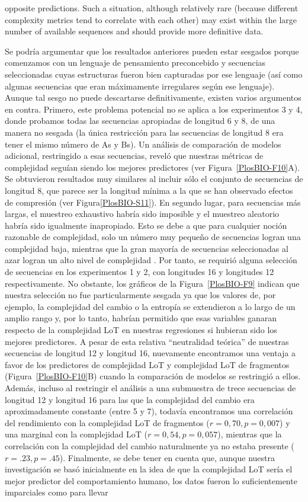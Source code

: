 opposite predictions. Such a situation, although relatively rare (because different complexity metrics tend to correlate with each other) may exist within the large number of available sequences and should provide more definitive data.

Se podría argumentar que los resultados anteriores pueden estar sesgados porque comenzamos con un lenguaje de pensamiento preconcebido y secuencias seleccionadas cuyas estructuras fueron bien capturadas por ese lenguaje (así como algunas secuencias que eran máximamente irregulares según ese lenguaje). Aunque tal sesgo no puede descartarse definitivamente, existen varios argumentos en contra. Primero, este problema potencial no se aplica a los experimentos 3 y 4, donde probamos todas las secuencias apropiadas de longitud 6 y 8, de una manera no sesgada (la única restricción para las secuencias de longitud 8 era tener el mismo número de As y Bs). Un análisis de comparación de modelos adicional, restringido a esas secuencias, reveló que nuestras métricas de complejidad seguían siendo los mejores predictores (ver Figura~\ref{PlosBIO-F10}A). Se obtuvieron resultados muy similares al incluir sólo el conjunto de secuencias de longitud 8, que parece ser la longitud mínima a la que se han observado efectos de compresión (ver Figura\ref{PlosBIO-S11}). En segundo lugar, para secuencias más largas, el muestreo exhaustivo habría sido imposible y el muestreo aleatorio habría sido igualmente inapropiado. Esto se debe a que para cualquier noción razonable de complejidad, solo un número muy pequeño de secuencias logran una complejidad baja, mientras que la gran mayoría de secuencias seleccionadas al azar logran un alto nivel de complejidad \cite{f43,li2013introduction}. Por tanto, se requirió alguna selección de secuencias en los experimentos 1 y 2, con longitudes 16 y longitudes 12 respectivamente. No obstante, los gráficos de la Figura~\ref{PlosBIO-F9} indican que nuestra selección no fue particularmente sesgada ya que los valores de, por ejemplo, la complejidad del cambio o la entropía se extendieron a lo largo de un amplio rango y, por lo tanto, habrían permitido que esas variables ganaran respecto de la complejidad LoT en nuestras regresiones si hubieran sido los mejores predictores. A pesar de esta relativa ``neutralidad teórica'' de nuestras secuencias de longitud 12 y longitud 16, nuevamente encontramos una ventaja a favor de los predictores de complejidad LoT y complejidad LoT de fragmentos (Figura~\ref{PlosBIO-F10}B) cuando la comparación de modelos se restringió a ellos. Además, incluso al restringir el análisis a una submuestra de trece secuencias de longitud 12 y longitud 16 para las que la complejidad del cambio era aproximadamente constante (entre 5 y 7), todavía encontramos una correlación del rendimiento con la complejidad LoT de fragmentos ($r = 0,70 , p = 0,007$) y una marginal con la complejidad LoT ($r = 0,54, p = 0,057$), mientras que la correlación con la complejidad del cambio naturalmente ya no estaba presente ($r = .23, p = .45$). Finalmente, se debe tener en cuenta que, aunque nuestra investigación se basó inicialmente en la idea de que la complejidad LoT sería el mejor predictor del comportamiento humano, los datos fueron lo suficientemente imparciales como para llevar 